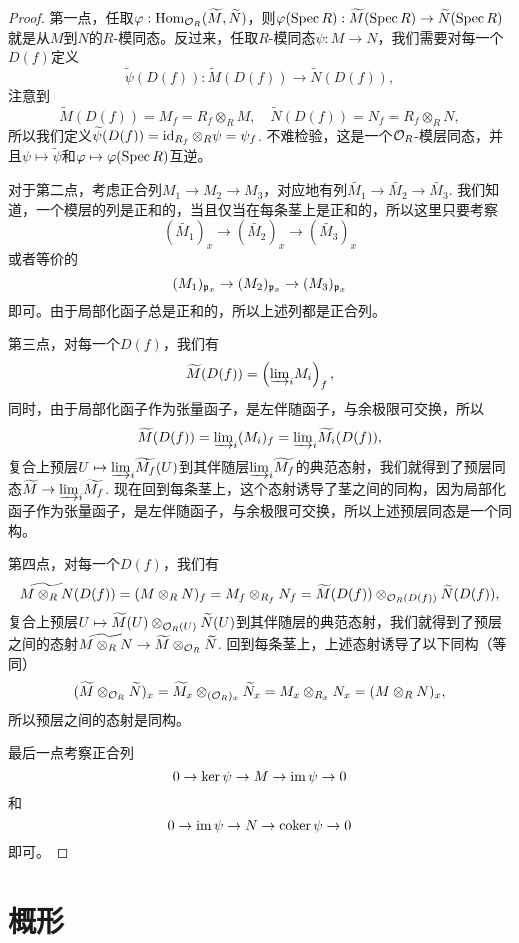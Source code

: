 \begin{proof}
第一点，任取$\varphi:\operatorname{Hom}_{\mathcal{O}_R}(\widetilde{M},\widetilde{N})$，则$\varphi(\operatorname{Spec} R):\widetilde{M}(\operatorname{Spec} R)\to \widetilde{N}(\operatorname{Spec} R)$就是从$M$到$N$的$R$-模同态。反过来，任取$R$-模同态$\psi:M\to N$，我们需要对每一个$D(f)$定义
\[
	\widetilde{\psi}(D(f)):\widetilde{M}(D(f))\to \widetilde{N}(D(f)),
\]
注意到
\[
	\widetilde{M}(D(f))=M_f=R_f\otimes_R M,\quad \widetilde{N}(D(f))=N_f=R_f\otimes_R N,
\]
所以我们定义$\widetilde{\psi}(D(f))=\operatorname{id}_{R_f}\otimes_R \psi=\psi_f$. 不难检验，这是一个$\mathcal{O}_R$-模层同态，并且$\psi\mapsto \widetilde{\psi}$和$\varphi\mapsto \varphi(\operatorname{Spec} R)$互逆。

对于第二点，考虑正合列$M_1\to M_2\to M_3$，对应地有列$\widetilde{M_1}\to \widetilde{M_2}\to \widetilde{M_3}$. 我们知道，一个模层的列是正和的，当且仅当在每条茎上是正和的，所以这里只要考察
\[
	\left(\widetilde{M_1}\right)_x\to \left(\widetilde{M_2}\right)_x\to \left(\widetilde{M_3}\right)_x
\]
或者等价的
\[
	(M_1)_{\mathfrak{p}_x}\to (M_2)_{\mathfrak{p}_x}\to (M_3)_{\mathfrak{p}_x}
\]
即可。由于局部化函子总是正和的，所以上述列都是正合列。

第三点，对每一个$D(f)$，我们有
\[
	\widetilde{M}(D(f))=\left({\varinjlim}_{i}M_i\right)_f,
\]
同时，由于局部化函子作为张量函子，是左伴随函子，与余极限可交换，所以
\[
	\widetilde{M}(D(f))={\varinjlim}_{i}(M_i)_f={\varinjlim}_{i}\widetilde{M_i}(D(f)),
\]
复合上预层$U\mapsto {\varinjlim}_{i}\widetilde{M_f}(U)$到其伴随层${\varinjlim}_{i}\widetilde{M_f}$的典范态射，我们就得到了预层同态$\widetilde{M}\to {\varinjlim}_{i}\widetilde{M_f}$. 现在回到每条茎上，这个态射诱导了茎之间的同构，因为局部化函子作为张量函子，是左伴随函子，与余极限可交换，所以上述预层同态是一个同构。

第四点，对每一个$D(f)$，我们有
\[
	\widetilde{M\otimes_R N}(D(f))=(M\otimes_R N)_f=M_f\otimes_{R_f}N_f=\widetilde{M}(D(f))\otimes_{\mathcal{O}_R(D(f))}\widetilde{N}(D(f)),
\]
复合上预层$U\mapsto \widetilde{M}(U)\otimes_{\mathcal{O}_R(U)}\widetilde{N}(U)$到其伴随层的典范态射，我们就得到了预层之间的态射$\widetilde{M\otimes_R N}\to \widetilde{M}\otimes_{\mathcal{O}_R}\widetilde{N}$. 回到每条茎上，上述态射诱导了以下同构（等同）
\[
	(\widetilde{M}\otimes_{\mathcal{O}_R}\widetilde{N})_x=\widetilde{M}_x\otimes_{(\mathcal{O}_R)_x}\widetilde{N}_x=M_{x}\otimes_{R_x}N_x=(M\otimes_R N)_x,
\]
所以预层之间的态射是同构。

最后一点考察正合列
\[
	0\to \ker \psi \to M \to \operatorname{im} \psi\to 0
\]
和
\[
	0\to \operatorname{im} \psi \to N \to \operatorname{coker} \psi\to 0
\]
即可。
\end{proof}

\section{概形}

